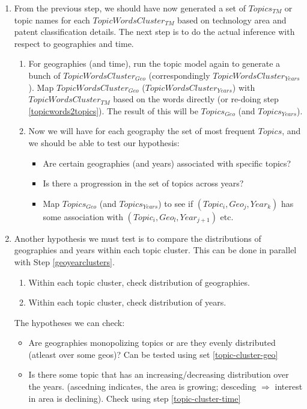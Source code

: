 \documentclass[11pt]{article}
\begin{document}
\begin{enumerate}
\item From the previous step, we should have now generated a set of $Topics_{TM}$ or topic names for each $TopicWordsCluster_{TM}$ based on technology area and patent classification details. The next step is to do the actual inference with respect to geographies and time. \label{geoyearclusters}
\begin{enumerate}
\item For geographies (and time), run the topic model again to generate a bunch of $TopicWordsCluster_{Geo}$ (correspondingly $TopicWordsCluster_{Years}$). Map $TopicWordsCluster_{Geo}$ ($TopicWordsCluster_{Years}$) with $TopicWordsCluster_{TM}$ based on the words directly (or re-doing step \ref{topicwords2topics}). The result of this will be $Topics_{Geo}$ (and $Topics_{Years}$).
\item Now we will have for each geography the set of most frequent $Topics$, and we should be able to test our hypothesis:
\begin{itemize}
\item Are certain geographies (and years) associated with specific topics? 
\item Is there a progression in the set of topics across years?
\item Map $Topics_{Geo}$ (and $Topics_{Years}$) to see if $(Topic_i, Geo_j, Year_k)$ has some association with $(Topic_i, Geo_l, Year_{j+1})$ etc.
\end{itemize}
\end{enumerate}

\item Another hypothesis we must test is to compare the distributions of geographies and years within each topic cluster. This can be done in parallel with Step \ref{geoyearclusters}.
\begin{enumerate}
\item Within each topic cluster, check distribution of geographies. \label{topic-cluster-geo}
\item Within each topic cluster, check distribution of years. \label{topic-cluster-time}
\end{enumerate}
The hypotheses we can check:
\begin{itemize}
\item Are geographies monopolizing topics or are they evenly distributed (atleast over some geos)? Can be tested using set \ref{topic-cluster-geo}
\item Is there some topic that has an increasing/decreasing distribution over the years. (ascedning indicates, the area is growing; desceding $\Rightarrow$ interest in area is declining). Check using step \ref{topic-cluster-time}
\end{itemize}
\end{enumerate}

\end{document}

